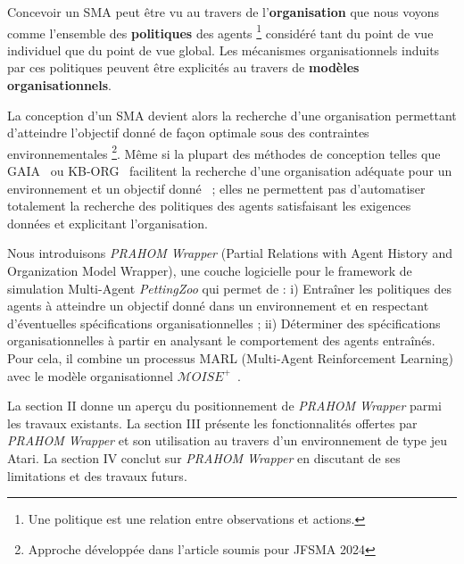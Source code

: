 \documentclass[demonstration]{jfsma}
\newcommand{\jp}[1]{\textbf{\color{red} JPJ: #1}}
\newcounter{relation}
\begin{document}

Concevoir un SMA peut être vu au travers de l'\textbf{organisation} que nous voyons comme l'ensemble des \textbf{politiques} des agents
\footnote{Une politique est une relation entre observations et actions.}
considéré tant du point de vue individuel que du point de vue global. Les mécanismes organisationnels induits par ces politiques peuvent être explicités au travers de \textbf{modèles organisationnels}.



La conception d'un SMA devient alors la recherche d'une organisation permettant d'atteindre l'objectif donné de façon optimale sous des contraintes environnementales
\footnote{Approche développée dans l'article  soumis pour JFSMA 2024 }.
Même si la plupart des méthodes de conception telles que GAIA~\cite{Cernuzzi2014} ou KB-ORG~\cite{Sims2008} facilitent la recherche d'une organisation adéquate pour un environnement et un objectif donné~\cite{Mefteh2013} ; elles ne permettent pas d'automatiser totalement la recherche des politiques des agents satisfaisant les exigences données et explicitant l'organisation.

Nous introduisons \emph{PRAHOM Wrapper} (Partial Relations with Agent History and Organization Model Wrapper), une couche logicielle pour le framework de simulation Multi-Agent \emph{PettingZoo} qui permet de :
%
i) Entraîner les politiques des agents à atteindre un objectif donné dans un environnement et en respectant d'éventuelles spécifications organisationnelles ;\quad
ii) Déterminer des spécifications organisationnelles à partir en analysant le comportement des agents entraînés.
%
Pour cela, il combine un processus MARL (Multi-Agent Reinforcement Learning) avec le modèle organisationnel $\mathcal{M}OISE^+$~\cite{Hubner2007}.

La section II donne un aperçu du positionnement de \emph{PRAHOM Wrapper} parmi les travaux existants.
La section III  présente les fonctionnalités offertes par \emph{PRAHOM Wrapper} et son utilisation au travers d'un environnement de type jeu Atari.
La section IV conclut sur \emph{PRAHOM Wrapper} en discutant de ses limitations et des travaux futurs.
\end{document}
